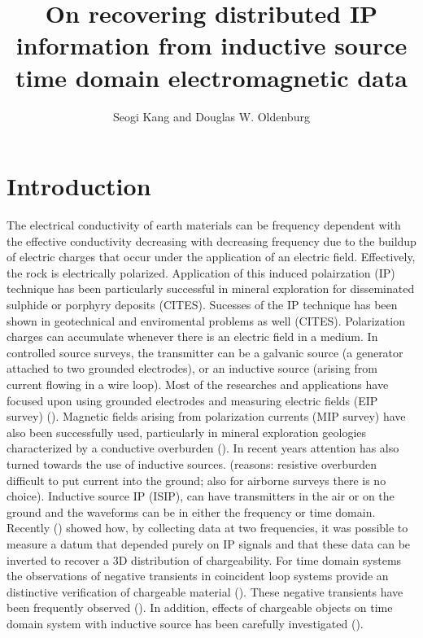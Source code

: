 \documentclass[a4paper, 11pt]{article}
\author{Seogi Kang and Douglas W. Oldenburg}
\title{On recovering distributed IP information from inductive source time domain electromagnetic data}
\begin{document}
\maketitle
\tableofcontents
\clearpage

\section{Introduction}
The electrical conductivity of earth materials can be frequency dependent with the effective conductivity decreasing with decreasing frequency due to the buildup of electric charges that occur under the application of an electric field.
Effectively, the rock is electrically polarized. 
Application of this induced polairzation (IP) technique has been particularly successful in mineral exploration for disseminated sulphide or porphyry deposits (CITES). Sucesses of the IP technique has been shown in geotechnical and enviromental problems as well (CITES). 
Polarization charges can accumulate whenever there is an electric field in a medium. In controlled source surveys, the transmitter can be a galvanic source (a generator attached to two grounded electrodes), or an inductive source (arising from current flowing in a wire loop). Most of the researches and applications have focused upon using grounded electrodes and measuring electric fields (EIP survey)  (\cite{seigel1959}). Magnetic fields arising from polarization currents (MIP survey) have also been successfully used, particularly in mineral exploration geologies characterized by a conductive overburden (\cite{seigel1974}). In recent years attention has also turned towards the use of inductive sources. (reasons:  resistive overburden difficult to put current into the ground; also for airborne surveys there is no choice).  Inductive source IP (ISIP), can have transmitters in the air or on the ground and the waveforms can be in either the frequency or time domain. Recently  (\cite{Marchant2012b}) showed how, by collecting data at two frequencies, it was possible to measure a datum that depended purely on IP signals and that these data can be inverted to recover a 3D distribution of chargeability. 
For time domain systems the observations of negative transients in coincident loop systems provide an distinctive verification of chargeable material (\cite{Weidelt1982}). These negative transients have been frequently observed (\cite{SmithandKlein,Kratzer2012,Kang2015a}). In addition, effects of chargeable objects on time domain system with inductive source has been carefully investigated (\cite{Smith1988a,Flis1989,ElKaliouby2004, Marchant2014}). 
\end{document}
